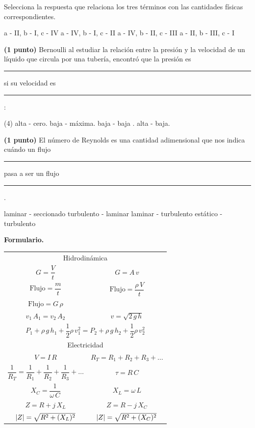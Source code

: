 \documentclass[12pt, letter]{exam}
\begin{document}
\begin{questions}
    Selecciona la respuesta que relaciona los tres términos con las cantidades físicas correspondientes.
    \begin{tasks}
        \task a - II, b - I, c - IV
        \task a - IV, b - I, c - II
        \task a - IV, b - II, c - III
        \task a - II, b - III, c - I
    \end{tasks}
    \question\textbf{(1 punto)} Bernoulli al estudiar la relación entre la presión y la velocidad de un líquido que circula por una tubería, encontró que la presión es \rule{2cm}{0.1mm} si su velocidad es \rule{2cm}{0.1mm}:
    \begin{tasks}(4)
        \task alta - cero.
        \task baja - máxima.
        \task baja - baja .
        \task alta - baja.
    \end{tasks}
    \question\textbf{(1 punto)} El número de Reynolds es una cantidad adimensional que nos indica cuándo un flujo \rule{2cm}{0.1mm} pasa a ser un flujo \rule{2cm}{0.1mm}.
    \begin{tasks}
        \task laminar - seccionado
        \task turbulento - laminar
        \task laminar  - turbulento
        \task estático - turbulento
    \end{tasks}

\end{questions}

\newpage

\vspace*{-1cm}

\textbf{\huge{Formulario.}}
\begin{table}[H]
    \centering
    \setlength{\tabcolsep}{40pt}
    \renewcommand{\arraystretch}{2.5}
    \begin{tabular}{c  c}
        \multicolumn{2}{c}{Hidrodinámica} \\
        $G = \dfrac{V}{t}$ & $G = A \, v$ \\
        $\text{Flujo} = \dfrac{m}{t}$ & $\text{Flujo} = \dfrac{\rho \, V}{t}$ \\
        $\text{Flujo} = G \, \rho$ & \\
        $v_{1} \, A_{1} = v_{2} \, A_{2}$ & $v = \sqrt{2 \, g \, h}$ \\
        \multicolumn{2}{c}{$P_{1} + \rho \, g \, h_{1} + \dfrac{1}{2} \rho \, v_{1}^{2} = P_{2} + \rho \, g \, h_{2} + \dfrac{1}{2} \rho \, v_{2}^{2}$} \\ \hline
        \multicolumn{2}{c}{Electricidad} \\
        $V = I \, R$ & $R_{T} = R_{1} + R_{2} + R_{3} + \ldots$ \\
        $\dfrac{1}{R_{T}} = \dfrac{1}{R_{1}} + \dfrac{1}{R_{2}} + \dfrac{1}{R_{3}} + \ldots$ & $\tau = R \, C$ \\
        $X_{C} = \dfrac{1}{\omega \, C}$ & $X_{L} = \omega\, L$ \\
        $Z = R + j \, X_{L}$ & $Z = R - j \, X_{C}$ \\
        $\abs{Z} = \sqrt{R^{2} + (X_{L})^{2}}$ & $\abs{Z} = \sqrt{R^{2} + (X_{C})^{2}}$ \\
\end{tabular}
\end{table}
\end{document}
